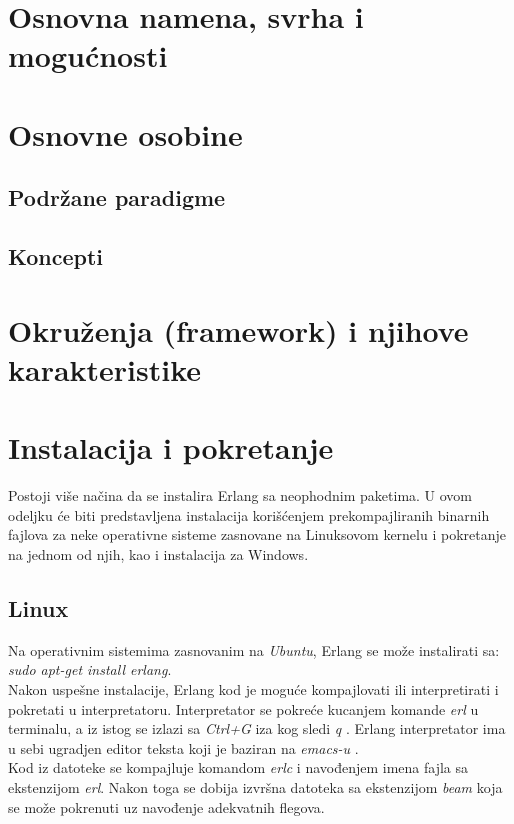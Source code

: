 \documentclass[a4paper]{article}
\begin{document}
{\section{Osnovna namena, svrha i mogućnosti}
\label{sec:namena}


\section{Osnovne osobine}
\label{sec:osobine}
 

\subsection{Podržane paradigme}
\label{subsec:paradigme}


\subsection{Koncepti}
\label{subsec:koncepti}


\section{Okruženja (framework) i njihove karakteristike}
\label{sec:okruzenja}
 

\section{Instalacija i pokretanje}
\label{sec:instalacija}

Postoji više načina da se instalira Erlang sa neophodnim paketima.
U ovom odeljku će biti predstavljena instalacija korišćenjem prekompajliranih binarnih fajlova 
za neke operativne sisteme zasnovane na Linuksovom kernelu i pokretanje na jednom od njih, kao 
i instalacija za Windows.

\subsection{Linux}
\label{subsec:instalacijaLinux}

Na operativnim sistemima zasnovanim na {\em Ubuntu}, Erlang se može instalirati sa:
{\em sudo apt-get install erlang}. \\
Nakon uspešne instalacije, Erlang kod je moguće kompajlovati
ili interpretirati i pokretati u interpretatoru.
Interpretator se pokreće kucanjem komande {\em erl} u terminalu, a iz istog
se izlazi sa {\em Ctrl+G} iza kog sledi {\em q} \cite{book_joe}.
Erlang interpretator ima u sebi ugradjen editor teksta koji je baziran na {\em emacs-u} \cite{book_fred}. \\
Kod iz datoteke se kompajluje komandom {\em erlc} i navođenjem imena fajla sa ekstenzijom {\em erl}.
Nakon toga se dobija izvršna datoteka sa ekstenzijom {\em beam} koja se može
pokrenuti uz navođenje adekvatnih flegova. 

}
\end{document}

